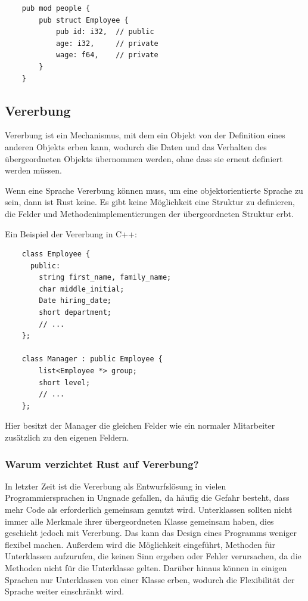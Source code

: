 \begin{lstlisting}
    pub mod people {
        pub struct Employee {
            pub id: i32,  // public
            age: i32,     // private
            wage: f64,    // private
        }
    }
\end{lstlisting}

\subsection{Vererbung}

Vererbung ist ein Mechanismus, mit dem ein Objekt von der Definition eines anderen Objekts erben kann, wodurch die Daten und das Verhalten des über\-ge\-ord\-ne\-ten Objekts übernommen werden, ohne dass sie erneut definiert werden müssen.

Wenn eine Sprache Vererbung können muss, um eine objektorientierte Sprache zu sein, dann ist Rust keine. Es gibt keine Möglichkeit eine Struktur zu definieren, die Felder und Methodenimplementierungen der übergeordneten Struktur erbt.

Ein Beispiel der Vererbung in C++:

\begin{lstlisting}
    class Employee {
      public:
        string first_name, family_name;
        char middle_initial;
        Date hiring_date;
        short department;
        // ...
    };

    class Manager : public Employee {
        list<Employee *> group;
        short level;
        // ...
    };
\end{lstlisting}

Hier besitzt der Manager die gleichen Felder wie ein normaler Mitarbeiter zu\-sätz\-lich zu den eigenen Feldern.

\subsubsection{Warum verzichtet Rust auf Vererbung?}

In letzter Zeit ist die Vererbung als Entwurfslösung in vielen Programmiersprachen in Ungnade gefallen, da häufig die Gefahr besteht, dass mehr Code als erforderlich gemeinsam genutzt wird. Unterklassen sollten nicht immer alle Merkmale ihrer übergeordneten Klasse gemeinsam haben, dies geschieht jedoch mit Vererbung. Das kann das Design eines Programms weniger flexibel machen. Außerdem wird die Möglichkeit eingeführt, Methoden für Unterklassen aufzurufen, die keinen Sinn ergeben oder Fehler verursachen, da die Methoden nicht für die Unterklasse gelten. Darüber hinaus können in einigen Sprachen nur Unterklassen von einer Klasse erben, wodurch die Flexibilität der Sprache weiter einschränkt wird.

